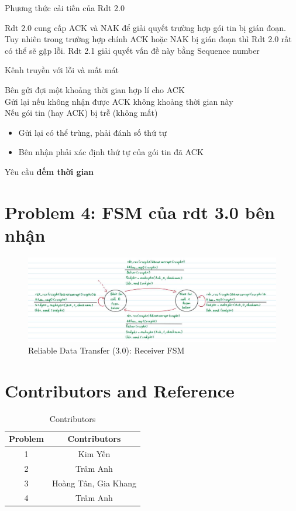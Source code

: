 \documentclass[12pt,a4paper]{article}
\begin{document}
\begin{description}[font=$\bullet$~\normalfont\scshape\color{red!50!black}]
    \item [Rdt 2.1] Phương thức cải tiến của Rdt 2.0
\end{description}
Rdt 2.0 cung cấp ACK và NAK để giải quyết trường hợp gói tin bị gián đoạn. Tuy nhiên trong
trường hợp chính ACK hoặc NAK bị gián đoạn thì Rdt 2.0 rất có thể sẽ gặp lỗi. Rdt 2.1 giải quyết
vấn đề này bằng Sequence number \\

\begin{description}[font=$\bullet$~\normalfont\scshape\color{red!50!black}]
    \item [Rdt 3.0] Kênh truyền với lỗi và mất mát
\end{description}
Bên gửi đợi một khoảng thời gian hợp lí cho ACK \\
Gửi lại nếu không nhận được ACK không khoảng thời gian này \\
Nếu gói tin (hay ACK) bị trễ (không mất)
\begin{itemize}
    \item Gửi lại có thể trùng, phải đánh số thứ tự
    \item Bên nhận phải xác định thứ tự của gói tin đã ACK
\end{itemize}
Yêu cầu \textbf{đếm thời gian}

\newpage

\section*{Problem 4: FSM của rdt 3.0 bên nhận}
\begin{figure}[h]
    \centering
    \includegraphics[scale=0.37]{rdt3}
    \caption{Reliable Data Transfer (3.0): Receiver FSM}
\end{figure}

\section*{Contributors and Reference}
\begin{table}[H]
    \caption{Contributors}
    \centering
    \begin{tabular}{c|c}
    \toprule
     \bf{Problem }  & \textbf{Contributors} \\
     \midrule
     1 & Kim Yến \\
     2 & Trâm Anh \\
     3 & Hoàng Tân, Gia Khang \\
     4 & Trâm Anh \\
     \bottomrule
    \end{tabular}
\end{table}
\end{document}
